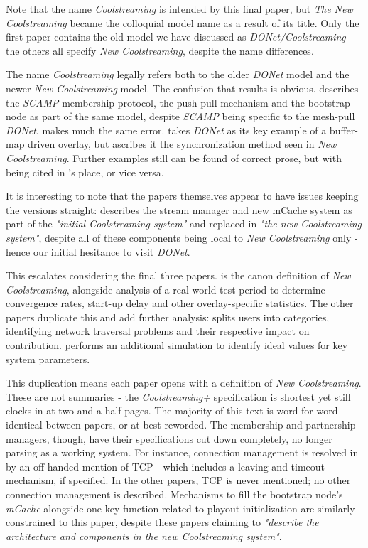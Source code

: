 \documentclass[12pt,a4paper]{article}
\begin{document}
Note that the name \textit{Coolstreaming} is intended by this final paper, but \textit{The New Coolstreaming} became the colloquial model name as a result of its title. Only the first paper contains the old model we have discussed as \textit{DONet/Coolstreaming} - the others all specify \textit{New Coolstreaming}, despite the name differences.

The name \textit{Coolstreaming} legally refers both to the older \textit{DONet} model and the newer \textit{New Coolstreaming} model. The confusion that results is obvious. \cite{Kondo2014} describes the \textit{SCAMP} membership protocol, the push-pull mechanism and the bootstrap node as part of the same model, despite \textit{SCAMP} being specific to the mesh-pull \textit{DONet}. \cite{Beraldi2010} makes much the same error. \cite{Lan2011} takes \textit{DONet} as its key example of a buffer-map driven overlay, but ascribes it the synchronization method seen in \textit{New Coolstreaming}. Further examples still can be found of correct prose, but with \cite{Xie2007} being cited in \cite{Zhang2005}'s place, or vice versa.

It is interesting to note that the papers themselves appear to have issues keeping the versions straight:  \cite{Li2008} describes the stream manager and new mCache system as part of the \textit{"initial Coolstreaming system"} and replaced in \textit{"the new Coolstreaming system"}, despite all of these components being local to \textit{New Coolstreaming} only - hence our initial hesitance to visit \textit{DONet}.

This escalates considering the final three papers. \cite{Xie2007} is the canon definition of \textit{New Coolstreaming}, alongside analysis of a real-world test period to determine convergence rates, start-up delay and other overlay-specific statistics. The other papers duplicate this and add further analysis: \cite{Li2007} splits users into categories, identifying network traversal problems and their respective impact on contribution. \cite{Li2008} performs an additional simulation to identify ideal values for key system parameters.

This duplication means each paper opens with a definition of \textit{New Coolstreaming}. These are not summaries - the \textit{Coolstreaming+} specification is shortest yet still clocks in at two and a half pages. The majority of this text is word-for-word identical between papers, or at best reworded. The membership and partnership managers, though, have their specifications cut down completely, no longer parsing as a working system. For instance, connection management is resolved in \cite{Xie2007} by an off-handed mention of TCP - which includes a leaving and timeout mechanism, if specified. In the other papers, TCP is never mentioned; no other connection management is described. Mechanisms to fill the bootstrap node's \textit{mCache} alongside one key function related to playout initialization are similarly constrained to this paper, despite these papers claiming to \textit{"describe the architecture and components in the new Coolstreaming system"}.
\end{document}
